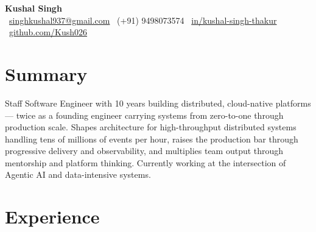 \documentclass[10pt,a4paper]{article}
\begin{document}
\begin{center}
    {\Huge\bfseries\color{primary} Kushal Singh}\\[4pt]
    {\color{muted}
        \faEnvelope\ \href{mailto:singhkushal937@gmail.com}{singhkushal937@gmail.com}
        \quad\textbar\quad
        \faPhone\ (+91) 9498073574
        \quad\textbar\quad
        \faLinkedin\ \href{https://linkedin.com/in/kushal-singh-thakur}{in/kushal-singh-thakur}
        \quad\textbar\quad
        \faGithub\ \href{https://github.com/Kush026}{github.com/Kush026}
    }
\end{center}

\section*{Summary}
Staff Software Engineer with 10 years building distributed, cloud-native platforms — twice as a founding engineer carrying systems from zero-to-one through production scale. Shapes architecture for high-throughput distributed systems handling tens of millions of events per hour, raises the production bar through progressive delivery and observability, and multiplies team output through mentorship and platform thinking. Currently working at the intersection of Agentic AI and data-intensive systems.

\section*{Experience}
\end{document}
